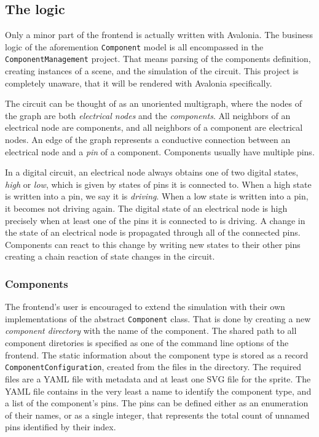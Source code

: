 \subsection{The logic}

Only a minor part of the frontend is actually written with Avalonia. The business logic of the aforemention \texttt{Component} model is all encompassed in the \texttt{ComponentManagement} project. That means parsing of the components definition, creating instances of a scene, and the simulation of the circuit. This project is completely unaware, that it will be rendered with Avalonia specifically.

The circuit can be thought of as an unoriented multigraph, where the nodes of the graph are both \textit{electrical nodes} and the \textit{components}. All neighbors of an electrical node are components, and all neighbors of a component are electrical nodes. An edge of the graph represents a conductive connection between an electrical node and a \textit{pin} of a component. Components usually have multiple pins. 

In a digital circuit, an electrical node always obtains one of two digital states, \textit{high} or \textit{low}, which is given by states of pins it is connected to. When a high state is written into a pin, we say it is \textit{driving}. When a low state is written into a pin, it becomes not driving again. The digital state of an electrical node is high precisely when at least one of the pins it is connected to is driving. A change in the state of an electrical node is propagated through all of the connected pins. Components can react to this change by writing new states to their other pins creating a chain reaction of state changes in the circuit.

\subsubsection{Components}

The frontend's user is encouraged to extend the simulation with their own implementations of the abstract \texttt{Component} class. That is done by creating a new \textit{component directory} with the name of the component. The shared path to all component diretories is specified as one of the command line options of the frontend. The static information about the component type is stored as a record \texttt{ComponentConfiguration}, created from the files in the directory. The required files are a YAML file with metadata and at least one SVG file for the sprite. The YAML file contains in the very least a name to identify the component type, and a list of the component's pins. The pins can be defined either as an enumeration of their names, or as a single integer, that represents the total count of unnamed pins identified by their index.

